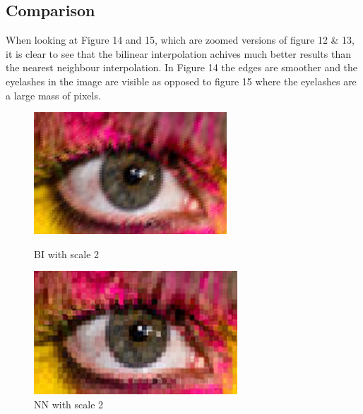 \documentclass{article}
\begin{document}
\subsection{Comparison}
When looking at Figure 14 and 15, which are zoomed versions of figure 12 \& 13, it is clear to see that the bilinear interpolation achives much better results than the nearest neighbour interpolation. In Figure 14 the edges are smoother and the eyelashes in the image are visible as opposed to figure 15 where the eyelashes are a large mass of pixels.

\begin{figure}[h!]
\centering
  \begin{minipage}[b]{0.45\textwidth}
    \includegraphics[width=\textwidth]{BI_2_zoom.png}
    \caption{BI with scale 2}
  \end{minipage}
  \hfill
  \begin{minipage}[b]{0.45\textwidth}
    \includegraphics[width=\textwidth]{NN_2_zoom.png}
    \caption{NN with scale 2}
  \end{minipage}
\end{figure}
\end{document}
